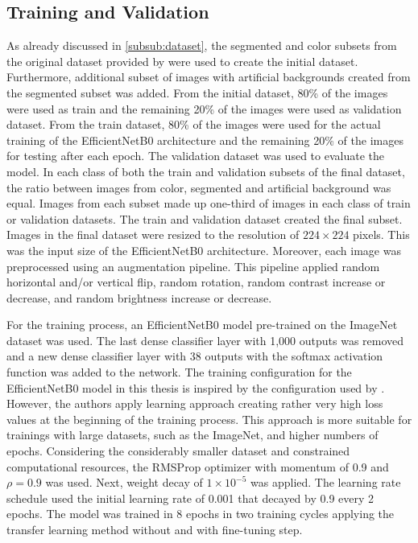 \documentclass{BachelorBUI}
\begin{document}
    \subsection{Training and Validation}
    As already discussed in \autoref{subsub:dataset}, the segmented and color subsets from the original dataset provided by \textcite{Mohanty:2016} were used to create the initial dataset. Furthermore, additional subset of images with artificial backgrounds created from the segmented subset was added. From the initial dataset, 80\% of the images were used as train and the remaining 20\% of the images were used as validation dataset. From the train dataset, 80\% of the images were used for the actual training of the EfficientNetB0 architecture and the remaining 20\% of the images for testing after each epoch. The validation dataset was used to evaluate the model. In each class of both the train and validation subsets of the final dataset, the ratio between images from color, segmented and artificial background was equal. Images from each subset made up one-third of images in each class of train or validation datasets. The train and validation dataset created the final subset. Images in the final dataset were resized to the resolution of $224 \times 224$ pixels. This was the input size of the EfficientNetB0 architecture. Moreover, each image was preprocessed using an augmentation pipeline. This pipeline applied  random horizontal and/or vertical flip, random rotation, random contrast increase or decrease, and random brightness increase or decrease.

    For the training process, an EfficientNetB0 model pre-trained on the ImageNet dataset was used. The last dense classifier layer with 1,000 outputs was removed and a new dense classifier layer with 38 outputs with the softmax activation function was added to the network. The training configuration for the EfficientNetB0 model in this thesis is inspired by the configuration used by \textcite{Tan:2019}. However, the authors apply learning approach creating rather very high loss values at the beginning of the training process. This approach is more suitable for trainings with large datasets, such as the ImageNet, and higher numbers of epochs. Considering the considerably smaller dataset and constrained computational resources, the RMSProp optimizer with momentum of 0.9 and $\rho = 0.9$ was used. Next, weight decay of $1 \times 10^{-5}$ was applied. The learning rate schedule used the initial learning rate of 0.001 that decayed by 0.9 every 2 epochs. The model was trained in 8 epochs in two training cycles applying the transfer learning method without and with fine-tuning step.
\end{document}
